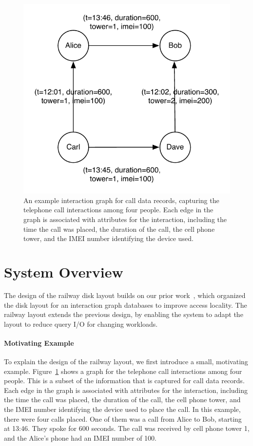 \begin{figure}[!Ht]
\includegraphics[width=0.9\columnwidth]{figures/example_interaction.pdf} 
 \caption{An example interaction graph for call data records, capturing the
   telephone call interactions among four people. Each edge in the graph is
   associated with attributes for the interaction, including the time the call
   was placed, the duration of the call, the cell phone tower, and the IMEI
   number identifying the device used.}
 \label{fig:example}
 \end{figure}


\section{System Overview}\label{sec:system}


The design of the railway disk layout builds on our prior work~\cite{gedik14}, 
which organized the disk layout for an interaction graph databases to improve
access locality. The railway layout extends the previous design, by enabling the
system to adapt the layout to reduce query I/O for changing workloads.

\paragraph*{Motivating Example}
%
To explain the design of the railway layout, we first introduce a small,
motivating example. Figure~\ref{fig:example} shows a graph for the telephone
call interactions among four people. This is a subset of the information that is
captured for call data records. Each edge in the graph is associated with
attributes for the interaction, including the time the call was placed, the
duration of the call, the cell phone tower, and the IMEI number identifying the
device used to place the call. In this example, there were four calls
placed. One of them was a call from Alice to Bob, starting at 13:46. They spoke
for 600 seconds. The call was received by cell phone tower 1, and the Alice's
phone had an IMEI number of 100.


